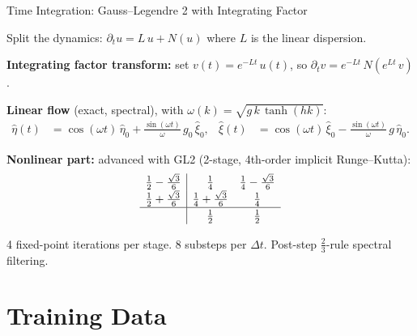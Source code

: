 \documentclass[aspectratio=169,11pt]{beamer}
\begin{document}
\begin{frame}{Time Integration: Gauss--Legendre 2 with Integrating Factor}

Split the dynamics: $\partial_t u = L\,u + N(u)$ where $L$ is the linear dispersion.

\pause

\textbf{Integrating factor transform:} set $v(t) = e^{-Lt}\,u(t)$, so $\partial_t v = e^{-Lt}\,N(e^{Lt}\,v)$.

\textbf{Linear flow} (exact, spectral), with $\omega(k) = \sqrt{g\,k\,\tanh(hk)}$:
\begin{align*}
  \hat\eta(t) &= \cos(\omega t)\,\hat\eta_0 + \tfrac{\sin(\omega t)}{\omega}\,g_0\,\hat\xi_0, &
  \hat\xi(t) &= \cos(\omega t)\,\hat\xi_0 - \tfrac{\sin(\omega t)}{\omega}\,g\,\hat\eta_0.
\end{align*}

\textbf{Nonlinear part:} advanced with GL2 (2-stage, 4th-order implicit Runge--Kutta):
\[
  \renewcommand{\arraystretch}{1.2}
  \begin{array}{c|cc}
    \tfrac{1}{2} - \tfrac{\sqrt{3}}{6} & \tfrac{1}{4} & \tfrac{1}{4} - \tfrac{\sqrt{3}}{6} \\
    \tfrac{1}{2} + \tfrac{\sqrt{3}}{6} & \tfrac{1}{4} + \tfrac{\sqrt{3}}{6} & \tfrac{1}{4} \\
    \hline
    & \tfrac{1}{2} & \tfrac{1}{2}
  \end{array}
\]

4 fixed-point iterations per stage. 8 substeps per $\Delta t$.
Post-step $\tfrac{2}{3}$-rule spectral filtering.
\end{frame}

\section{Training Data}
\end{document}
